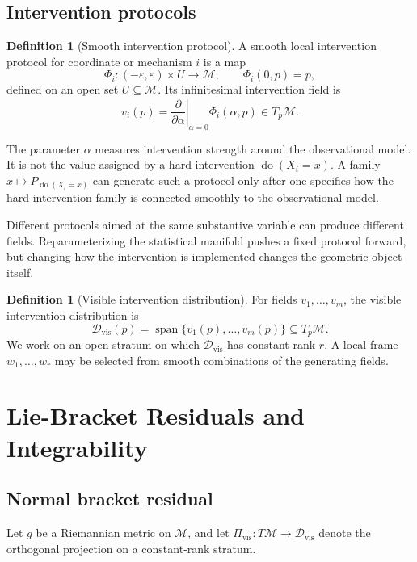 \documentclass{article}
\theoremstyle{plain}
\theoremstyle{definition}
\newtheorem{definition}[theorem]{Definition}
\theoremstyle{remark}
\newcommand{\M}{\mathcal M}
\newcommand{\Dvis}{\mathcal D_{\mathrm{vis}}}
\newcommand{\Pvis}{\Pi_{\mathrm{vis}}}
\newcommand{\eps}{\varepsilon}
\newcommand{\doop}{\operatorname{do}}
\newcommand{\Span}{\operatorname{span}}
\begin{document}
\subsection{Intervention protocols}

\begin{definition}[Smooth intervention protocol]
\label{def:protocol}
A smooth local intervention protocol for coordinate or mechanism \(i\) is a map
\[
  \Phi_i:(-\eps,\eps)\times U\longrightarrow\M,
  \qquad
  \Phi_i(0,p)=p,
\]
defined on an open set \(U\subseteq\M\).  Its infinitesimal intervention field
is
\[
  v_i(p)=
  \left.\frac{\partial}{\partial\alpha}\right|_{\alpha=0}
  \Phi_i(\alpha,p)\in T_p\M .
\]
\end{definition}

The parameter \(\alpha\) measures intervention strength around the
observational model.  It is not the value assigned by a hard intervention
\(\doop(X_i=x)\).  A family \(x\mapsto P_{\doop(X_i=x)}\) can generate such a
protocol only after one specifies how the hard-intervention family is connected
smoothly to the observational model.

Different protocols aimed at the same substantive variable can produce
different fields.  Reparameterizing the statistical manifold pushes a fixed
protocol forward, but changing how the intervention is implemented changes the
geometric object itself.

\begin{definition}[Visible intervention distribution]
\label{def:distribution}
For fields \(v_1,\ldots,v_m\), the visible intervention distribution is
\[
  \Dvis(p)=\Span\{v_1(p),\ldots,v_m(p)\}\subseteq T_p\M .
\]
We work on an open stratum on which \(\Dvis\) has constant rank \(r\).  A local
frame \(w_1,\ldots,w_r\) may be selected from smooth combinations of the
generating fields.
\end{definition}

\section{Lie-Bracket Residuals and Integrability}
\label{sec:residuals}

\subsection{Normal bracket residual}

Let \(g\) be a Riemannian metric on \(\M\), and let
\(\Pvis:T\M\to\Dvis\) denote the orthogonal projection on a constant-rank
stratum.
\end{document}
